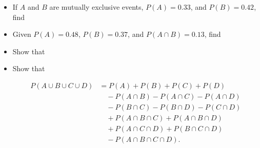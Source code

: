 \begin{Ejer}

\begin{itemize}
\item[a) ] If $A$ and $B$ are mutually exclusive events, $P(A)=0.33$, and $P(B)=0.42$, find

\begin{itemize}
\end{itemize}

\item[b) ] Given $P(A)=0.48$, $P(B)=0.37$, and $P(A\cap B)=0.13$, find

\begin{itemize}
\end{itemize}

\item[c) ] Show that

\begin{itemize}
\end{itemize}

\item[d) ] Show that

\begin{align*}
P(A\cup B\cup C\cup D) &= P(A)+P(B)+P(C)+P(D) \\
&\quad -P(A\cap B)-P(A\cap C)-P(A\cap D) \\
&\quad -P(B\cap C)-P(B\cap D)-P(C\cap D) \\
&\quad +P(A\cap B\cap C)+P(A\cap B\cap D) \\
&\quad +P(A\cap C\cap D)+P(B\cap C\cap D) \\
&\quad -P(A\cap B\cap C\cap D).
\end{align*}

\end{itemize}
\end{Ejer}


